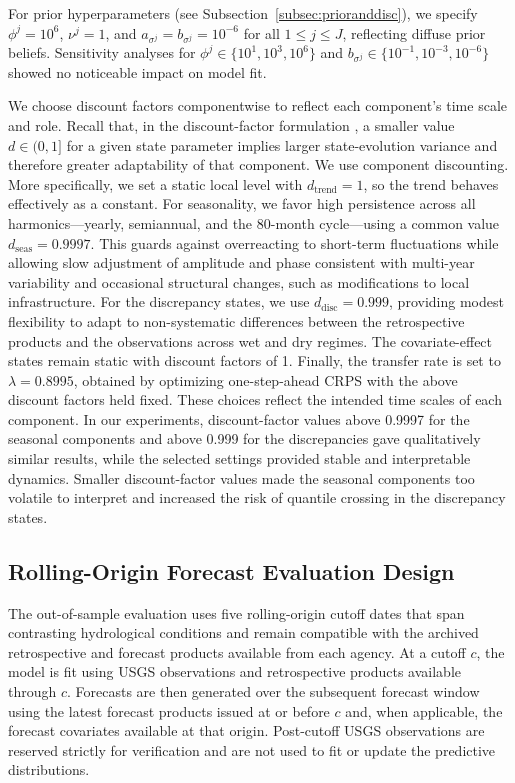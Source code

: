 \documentclass[APA,STIX1COL]{WileyNJD-v2}
\begin{document}
For prior hyperparameters (see Subsection~\ref{subsec:prioranddisc}), we specify \(\phi^j = 10^6\), \(\nu^j = 1\), and \(a_{\sigma^j} = b_{\sigma^j} = 10^{-6}\) for all \(1 \leq j \leq J\), reflecting diffuse prior beliefs. Sensitivity analyses for \(\phi^j \in \{10^1, 10^3, 10^6\}\) and \(b_{\sigma^j} \in \{10^{-1}, 10^{-3}, 10^{-6}\}\) showed no noticeable impact on model fit.

We choose discount factors componentwise to reflect each component’s time scale and role. Recall that, in the discount-factor formulation \citep{prado2021time}, a smaller value \(d \in (0,1]\) for a given state parameter implies larger state-evolution variance and therefore greater adaptability of that component. We use component discounting. More specifically, we set a static local level with \(d_{\text{trend}}=1\), so the trend behaves effectively as a constant. For seasonality, we favor high persistence across all harmonics---yearly, semiannual, and the 80-month cycle---using a common value \(d_{\text{seas}}=0.9997\). This guards against overreacting to short-term fluctuations while allowing slow adjustment of amplitude and phase consistent with multi-year variability and occasional structural changes, such as modifications to local infrastructure. For the discrepancy states, we use \(d_{\text{disc}}=0.999\), providing modest flexibility to adapt to non-systematic differences between the retrospective products and the observations across wet and dry regimes. The covariate-effect states remain static with discount factors of 1. Finally, the transfer rate is set to \(\lambda=0.8995\), obtained by optimizing one-step-ahead CRPS with the above discount factors held fixed. These choices reflect the intended time scales of each component. In our experiments, discount-factor values above 0.9997 for the seasonal components and above 0.999 for the discrepancies gave qualitatively similar results, while the selected settings provided stable and interpretable dynamics. Smaller discount-factor values made the seasonal components too volatile to interpret and increased the risk of quantile crossing in the discrepancy states.

\subsection{Rolling-Origin Forecast Evaluation Design}

The out-of-sample evaluation uses five rolling-origin cutoff dates that span contrasting hydrological conditions and remain compatible with the archived retrospective and forecast products available from each agency. At a cutoff \(c\), the model is fit using USGS observations and retrospective products available through \(c\). Forecasts are then generated over the subsequent forecast window using the latest forecast products issued at or before \(c\) and, when applicable, the forecast covariates available at that origin. Post-cutoff USGS observations are reserved strictly for verification and are not used to fit or update the predictive distributions.
\end{document}
